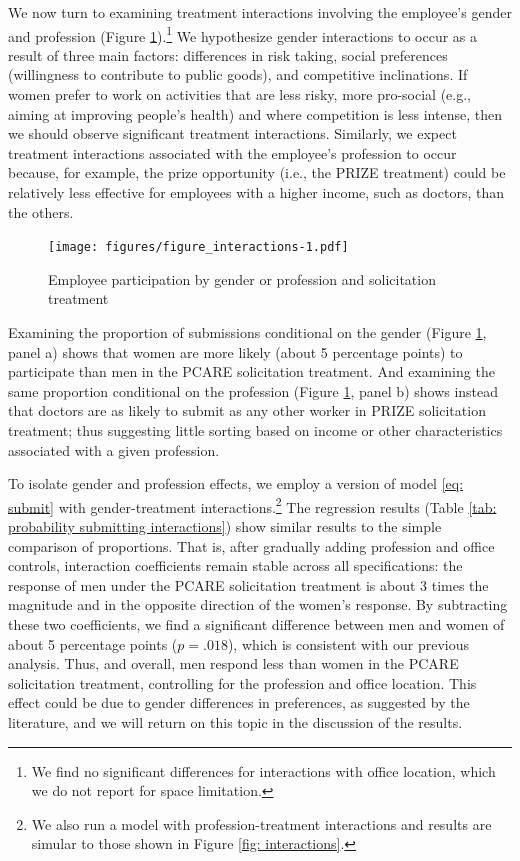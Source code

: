 \documentclass[12pt, titlepage]{article}
\begin{document}
We now turn to examining treatment interactions involving the employee's
gender and profession (Figure \ref{interactions}).\footnote{We find no
  significant differences for interactions with office location, which
  we do not report for space limitation.} We hypothesize gender
interactions to occur as a result of three main factors: differences in
risk taking, social preferences (willingness to contribute to public
goods), and competitive inclinations. If women prefer to work on
activities that are less risky, more pro-social (e.g., aiming at
improving people's health) and where competition is less intense, then
we should observe significant treatment interactions. Similarly, we
expect treatment interactions associated with the employee's profession
to occur because, for example, the prize opportunity (i.e., the PRIZE
treatment) could be relatively less effective for employees with a
higher income, such as doctors, than the others.

\begin{figure} 
\caption{Employee participation by gender or profession and solicitation treatment}
  \label{interactions}
  \centering
  \texttt{[image: figures/figure\_interactions-1.pdf]}
\end{figure}

Examining the proportion of submissions conditional on the gender
(Figure \ref{interactions}, panel a) shows that women are more likely
(about 5 percentage points) to participate than men in the PCARE
solicitation treatment. And examining the same proportion conditional on
the profession (Figure \ref{interactions}, panel b) shows instead that
doctors are as likely to submit as any other worker in PRIZE
solicitation treatment; thus suggesting little sorting based on income
or other characteristics associated with a given profession.

To isolate gender and profession effects, we employ a version of model
\eqref{eq: submit} with gender-treatment interactions.\footnote{We also
  run a model with profession-treatment interactions and results are
  simular to those shown in Figure \ref{fig: interactions}.} The
regression results (Table
\ref{tab: probability submitting interactions}) show similar results to
the simple comparison of proportions. That is, after gradually adding
profession and office controls, interaction coefficients remain stable
across all specifications: the response of men under the PCARE
solicitation treatment is about 3 times the magnitude and in the
opposite direction of the women's response. By subtracting these two
coefficients, we find a significant difference between men and women of
about 5 percentage points (\(p=.018\)), which is consistent with our
previous analysis. Thus, and overall, men respond less than women in the
PCARE solicitation treatment, controlling for the profession and office
location. This effect could be due to gender differences in preferences,
as suggested by the literature, and we will return on this topic in the
discussion of the results.
\end{document}
